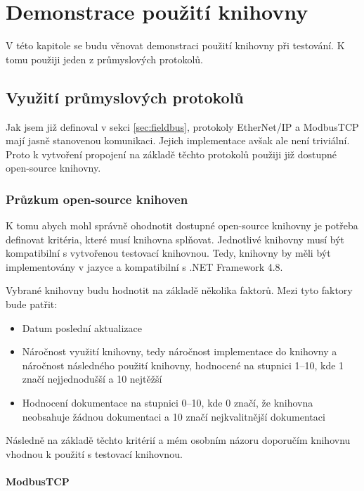 \chapter{Demonstrace použití knihovny}

V této kapitole se budu věnovat demonstraci použití knihovny při testování. K tomu použiji jeden z průmyslových protokolů.

\section{Využití průmyslových protokolů}
Jak jsem již definoval v sekci \ref{sec:fieldbus}, protokoly EtherNet/IP a ModbusTCP mají jasně stanovenou komunikaci. Jejich implementace avšak ale není triviální. Proto k vytvoření propojení na základě těchto protokolů použiji již dostupné open-source knihovny.  

\subsection{Průzkum open-source knihoven}
K tomu abych mohl správně ohodnotit dostupné open-source knihovny je potřeba definovat kritéria, které musí knihovna splňovat. Jednotlivé knihovny musí být kompatibilní s vytvořenou testovací knihovnou. Tedy, knihovny by měli být implementovány v jazyce \csharp{} a kompatibilní s .NET Framework 4.8. 

Vybrané knihovny budu hodnotit na základě několika faktorů. Mezi tyto faktory bude patřit:

\begin{itemize}
    \item Datum poslední aktualizace
    \item Náročnost využití knihovny, tedy náročnost implementace do knihovny a náročnost následného použití knihovny, hodnocené na stupnici 1--10, kde 1 značí nejjednodušší a 10 nejtěžší 
    \item Hodnocení dokumentace na stupnici 0--10, kde 0 značí, že knihovna neobsahuje žádnou dokumentaci a 10 značí nejkvalitnější dokumentaci
\end{itemize}

Následně na základě těchto kritérií a mém osobním názoru doporučím knihovnu vhodnou k použití s testovací knihovnou. 

\subsubsection{ModbusTCP}


